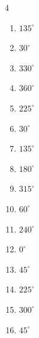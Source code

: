 \begin{multicols}{4}
\begin{enumerate}
\columnbreak %

  \item $\displaystyle 135^{\circ}$

  \item $\displaystyle 30^{\circ}$

  \item $\displaystyle 330^{\circ}$

  \item $\displaystyle 360^{\circ}$
        \phantom{$\displaystyle =2\pi$}

  \item $\displaystyle 225^{\circ}$

  \item $\displaystyle 30^{\circ}$

  \item $\displaystyle 135^{\circ}$

  \item $\displaystyle 180^{\circ}$
        \phantom{$\displaystyle =\pi$}

  \item $\displaystyle 315^{\circ}$

  \item $\displaystyle 60^{\circ}$

  \item $\displaystyle 240^{\circ}$

  \item $\displaystyle 0^{\circ}$
        \phantom{$\displaystyle =0$}

  \item $\displaystyle 45^{\circ}$

  \item $\displaystyle 225^{\circ}$

  \item $\displaystyle 300^{\circ}$

  \item $\displaystyle 45^{\circ}$


\end{enumerate}
\end{multicols}
